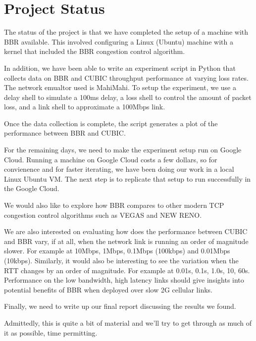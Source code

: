 
\section{Project Status}

The status of the project is that we have completed the setup of a machine with BBR available. This involved
configuring a Linux (Ubuntu) machine with a kernel that included the BBR congestion control algorithm.

In addition, we have been able to write an experiment script in Python that collects data on BBR and CUBIC
throughput performance at varying loss rates. The network emualtor used is MahiMahi. To setup the experiment,
we use a delay shell to simulate a 100ms delay, a loss shell to control the amount of packet loss, and a link
shell to approximate a 100Mbps link.

Once the data collection is complete, the script generates a plot of the performance between BBR and CUBIC.


For the remaining days, we need to make the experiment setup run on Google Cloud. Running a machine on Google Cloud
costs a few dollars, so for convienence and for faster iterating, we have been doing our work in a local Linux Ubuntu
VM. The next step is to replicate that setup to run successfully in the Google Cloud.

We would also like to explore how BBR compares to other modern TCP congestion control algorithms
such as VEGAS and NEW RENO.

We are also interested on evaluating how does the performance between CUBIC and BBR vary, if at all, when the network
link is running an order of magnitude slower. For example at 10Mbps, 1Mbps, 0.1Mbps (100kbps) and 0.01Mbps (10kbps).
Similarly, it would also be interesting to see the variation when the RTT changes by an order of magnitude. For example
at 0.01s, 0.1s, 1.0s, 10, 60s. Performance on the low bandwidth, high latency links should give insights into
potential benefits of BBR when deployed over slow 2G cellular links.

Finally, we need to write up our final report discussing the results we found.

Admittedly, this is  quite a bit of material and we'll try to get through as much of it as possible, time permitting.

